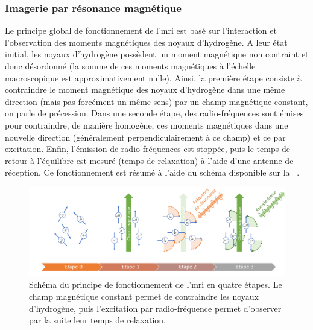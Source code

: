 \subsubsection{Imagerie par résonance magnétique}
Le principe global de fonctionnement de l'\gls{mri} est basé sur l'interaction et l'observation des moments magnétiques des noyaux d'hydrogène. A leur état initial, les noyaux d'hydrogène possèdent un moment magnétique non contraint et donc désordonné (la somme de ces moments magnétiques à l'échelle macroscopique est approximativement nulle). Ainsi, la première étape consiste à contraindre le moment magnétique des noyaux d'hydrogène dans une même direction (mais pas forcément un même sens) par un champ magnétique constant, on parle de précession. Dans une seconde étape, des radio-fréquences sont émises pour contraindre, de manière homogène, ces moments magnétiques dans une nouvelle direction (généralement perpendiculairement à ce champ) et ce par excitation. Enfin, l'émission de radio-fréquences est stoppée, puis le temps de retour à l'équilibre est mesuré (temps de relaxation) à l'aide d'une antenne de réception. Ce fonctionnement est résumé à l'aide du schéma disponible sur la ~.\par

\begin{figure}[H]
    \centering
    \includegraphics[width=\linewidth]{contents/chapter_2/resources/scheme_principle_mri.pdf}
    \caption{Schéma du principe de fonctionnement de l'\gls{mri} en quatre étapes. Le champ magnétique constant permet de contraindre les noyaux d'hydrogène, puis l'excitation par radio-fréquence permet d'observer par la suite leur temps de relaxation.}
    \label{fig:scheme_principle_mri}
\end{figure}\par

